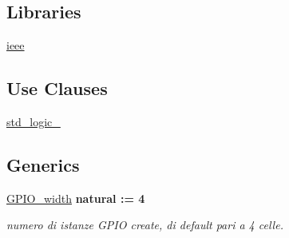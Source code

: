 \subsection*{Libraries}
 \begin{DoxyCompactItemize}
\item 
\hypertarget{class_g_p_i_oarray_ga0a6af6eef40212dbaf130d57ce711256}{\hyperlink{group___g_p_i_o-array_ga0a6af6eef40212dbaf130d57ce711256}{ieee} }\label{class_g_p_i_oarray_ga0a6af6eef40212dbaf130d57ce711256}

\end{DoxyCompactItemize}
\subsection*{Use Clauses}
 \begin{DoxyCompactItemize}
\item 
\hypertarget{class_g_p_i_oarray_gacd03516902501cd1c7296a98e22c6fcb}{\hyperlink{group___g_p_i_o-array_gacd03516902501cd1c7296a98e22c6fcb}{std\+\_\+logic\+\_}   }\label{class_g_p_i_oarray_gacd03516902501cd1c7296a98e22c6fcb}

\end{DoxyCompactItemize}
\subsection*{Generics}
 \begin{DoxyCompactItemize}
\item 
\hypertarget{class_g_p_i_oarray_ga0b52ca75e9a6093b2b60d5e851803069}{\hyperlink{group___g_p_i_o-array_ga0b52ca75e9a6093b2b60d5e851803069}{G\+P\+I\+O\+\_\+width} {\bfseries {\bfseries \textcolor{vhdlchar}{natural}\textcolor{vhdlchar}{ }\textcolor{vhdlchar}{ }\textcolor{vhdlchar}{\+:}\textcolor{vhdlchar}{=}\textcolor{vhdlchar}{ }\textcolor{vhdlchar}{ } \textcolor{vhdldigit}{4} \textcolor{vhdlchar}{ }}}}\label{class_g_p_i_oarray_ga0b52ca75e9a6093b2b60d5e851803069}

\begin{DoxyCompactList}\small\item\em numero di istanze G\+P\+I\+O create, di default pari a 4 celle. \end{DoxyCompactList}\end{DoxyCompactItemize}
